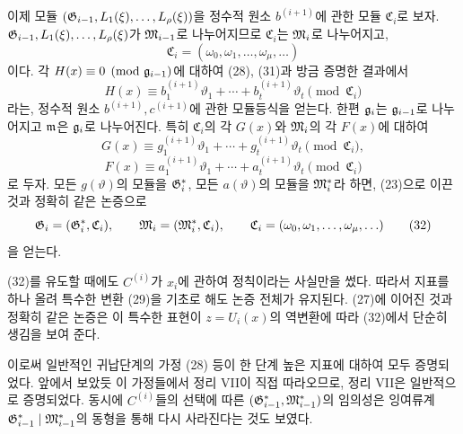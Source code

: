 이제 모듈 \((\mathfrak G_{i-1},L_1(\xi),\ldots,L_\rho(\xi))\)을 정수적 원소 \(b^{(i+1)}\)에 관한 모듈 \(\mathfrak C_i\)로 보자. \(\mathfrak G_{i-1},L_1(\xi),\ldots,L_\rho(\xi)\)가 \(\mathfrak M_{i-1}\)로 나누어지므로 \(\mathfrak C_i\)는 \(\mathfrak M_i\)로 나누어지고,
\[
\mathfrak C_i=(\omega_0,\omega_1,\ldots,\omega_\mu,\ldots)
\]
이다. 각 \(H(x)\equiv0\pmod{\mathfrak g_{i-1}}\)에 대하여 (28), (31)과 방금 증명한 결과에서
\[
H(x)\equiv
b_1^{(i+1)}\vartheta_1+\cdots+b_t^{(i+1)}\vartheta_t
\pmod{\mathfrak C_i}
\]
라는, 정수적 원소 \(b^{(i+1)},c^{(i+1)}\)에 관한 모듈등식을 얻는다. 한편 \(\mathfrak g_i\)는 \(\mathfrak g_{i-1}\)로 나누어지고 \(\mathfrak m\)은 \(\mathfrak g_i\)로 나누어진다. 특히 \(\mathfrak C_i\)의 각 \(G(x)\)와 \(\mathfrak M_i\)의 각 \(F(x)\)에 대하여
\[
G(x)\equiv g_1^{(i+1)}\vartheta_1+\cdots+
g_t^{(i+1)}\vartheta_t\pmod{\mathfrak C_i},
\]
\[
F(x)\equiv a_1^{(i+1)}\vartheta_1+\cdots+
a_t^{(i+1)}\vartheta_t\pmod{\mathfrak C_i}
\]
로 두자. 모든 \(g(\vartheta)\)의 모듈을 \(\mathfrak G_i^*\), 모든 \(a(\vartheta)\)의 모듈을 \(\mathfrak M_i^*\)라 하면, (23)으로 이끈 것과 정확히 같은 논증으로
\begin{equation}
\mathfrak G_i=(\mathfrak G_i^*,\mathfrak C_i),\qquad
\mathfrak M_i=(\mathfrak M_i^*,\mathfrak C_i),\qquad
\mathfrak C_i=(\omega_0,\omega_1,\ldots,\omega_\mu,\ldots)
\tag{32}
\end{equation}
을 얻는다.

(32)를 유도할 때에도 \(C^{(i)}\)가 \(x_i\)에 관하여 정칙이라는 사실만을 썼다. 따라서 지표를 하나 올려 특수한 변환 (29)을 기초로 해도 논증 전체가 유지된다. (27)에 이어진 것과 정확히 같은 논증은 이 특수한 표현이 \(z=U_i(x)\)의 역변환에 따라 (32)에서 단순히 생김을 보여 준다.

이로써 일반적인 귀납단계의 가정 (28) 등이 한 단계 높은 지표에 대하여 모두 증명되었다. 앞에서 보았듯 이 가정들에서 정리 VII이 직접 따라오므로, 정리 VII은 일반적으로 증명되었다. 동시에 \(C^{(i)}\)들의 선택에 따른 \((\mathfrak G^*_{i-1},\mathfrak M^*_{i-1})\)의 임의성은 잉여류계 \(\mathfrak G^*_{i-1}\mid\mathfrak M^*_{i-1}\)의 동형을 통해 다시 사라진다는 것도 보였다.

